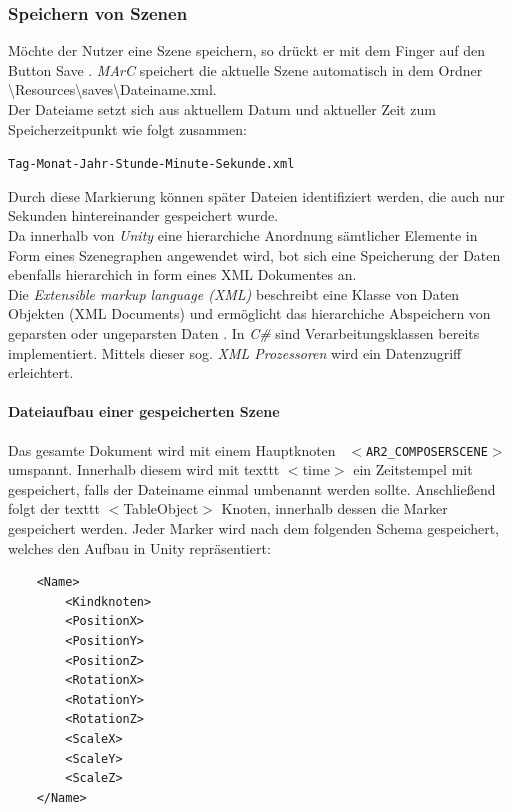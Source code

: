 \subsubsection{Speichern von Szenen}
\label{Speichern}
Möchte der Nutzer eine Szene speichern, so drückt er mit dem Finger auf den Button \glqq Save \grqq{}. \textit{MArC} speichert die aktuelle Szene automatisch in dem Ordner \glqq \textbackslash Resources\textbackslash saves\textbackslash Dateiname.xml\grqq{}.\\
Der Dateiame setzt sich aus aktuellem Datum und aktueller Zeit zum Speicherzeitpunkt wie folgt zusammen:
\begin{center}
	\texttt{Tag-Monat-Jahr-Stunde-Minute-Sekunde.xml}
\end{center}
Durch diese Markierung können später Dateien identifiziert werden, die auch nur Sekunden hintereinander gespeichert wurde.\\
Da innerhalb von \textit{Unity} eine hierarchiche Anordnung sämtlicher Elemente in Form eines Szenegraphen angewendet wird, bot sich eine Speicherung der Daten ebenfalls hierarchich in form eines XML Dokumentes an.\\
Die \textit{Extensible markup language (XML)} beschreibt eine Klasse von Daten Objekten (XML Documents) und ermöglicht das hierarchiche Abspeichern von geparsten oder ungeparsten Daten \cite{bray1998extensible}. In \textit{C\#} sind Verarbeitungsklassen bereits implementiert. Mittels dieser sog. \textit{XML Prozessoren} wird ein Datenzugriff erleichtert.

\paragraph{Dateiaufbau einer gespeicherten Szene}
Das gesamte Dokument wird mit einem Hauptknoten \texttt{ $<$AR2\_COMPOSERSCENE$>$} umspannt. Innerhalb diesem wird mit texttt{ $<$time$>$}
ein Zeitstempel mit gespeichert, falls der Dateiname einmal umbenannt werden sollte.
Anschließend folgt der texttt{ $<$TableObject$>$} Knoten, innerhalb dessen die Marker gespeichert werden. Jeder Marker wird nach dem folgenden Schema gespeichert, welches den Aufbau in Unity repräsentiert:


 \begin{lstlisting}
	<Name>
		<Kindknoten>
		<PositionX>
		<PositionY>
		<PositionZ>
		<RotationX>
		<RotationY>
		<RotationZ>
		<ScaleX>
		<ScaleY>
		<ScaleZ>
	</Name>
 \end{lstlisting}


